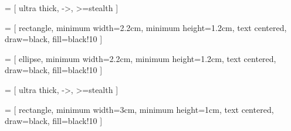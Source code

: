 %
%


%
%

 = [
    ultra thick,
    ->,
    >=stealth
]

 = [
    rectangle,
    minimum width=2.2cm,
    minimum height=1.2cm,
    text centered,
    draw=black,
    fill=black!10
]

\usetikzlibrary{shapes}
 = [
    ellipse,
    minimum width=2.2cm,
    minimum height=1.2cm,
    text centered,
    draw=black,
    fill=black!10
]

%
%

 = [
    ultra thick,
    ->,
    >=stealth
]



 = [
    rectangle,
    minimum width=3cm,
    minimum height=1cm,
    text centered,
    draw=black,
    fill=black!10
]


